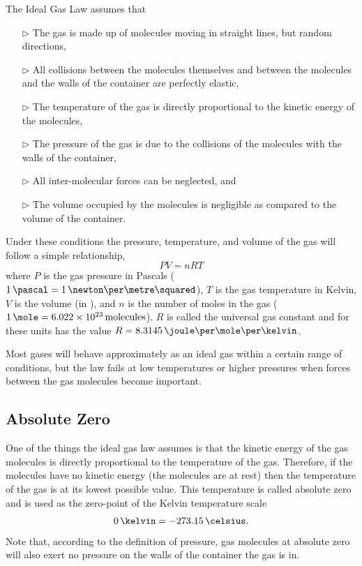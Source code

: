 The Ideal Gas Law assumes that
\begin{itemize}
\item[$\triangleright$] The gas is made up of molecules moving in straight lines, but random directions,
\item[$\triangleright$] All collisions between the molecules themselves and between the molecules and the walls of the container are perfectly elastic,
\item[$\triangleright$] The temperature of the gas is directly proportional to the kinetic energy of the molecules,
\item[$\triangleright$] The pressure of the gas is due to the collisions of the molecules with the walls of the container,
\item[$\triangleright$] All inter-molecular forces can be neglected, and
\item[$\triangleright$] The volume occupied by the molecules is negligible as compared to the volume of the container.
\end{itemize}
Under these conditions the pressure, temperature, and volume of the gas will follow a simple relationship,
\begin{equation}
  \label{eq:idealgas}
  P V = n R T
\end{equation}
where
$P$ is the gas pressure in Pascals ($1\,\pascal = 1\,\newton\per\metre\squared$), $T$ is the gas temperature in Kelvin, $V$ is the volume (in \metre\cubed), and $n$ is the number of moles in the gas ($1\,\mole = 6.022\times10^{23}\,\mbox{molecules}$).  $R$ is called the universal gas constant and for these units has the value $R = 8.3145\,\joule\per\mole\per\kelvin$.

Most gases will behave approximately as an ideal gas within a certain range of conditions, but the law fails at low temperatures or higher pressures when forces between the gas molecules become important.

\subsection{Absolute Zero}

One of the things the ideal gas law assumes is that the kinetic energy of the gas molecules is directly proportional to the temperature of the gas. Therefore, if the molecules have no kinetic energy (the molecules are at rest) then the temperature of the gas is at its lowest possible value. This temperature is called absolute zero and is used as the zero-point of the Kelvin temperature scale
\[
0\,\kelvin = -273.15\,\celsius.
\]
Note that, according to the definition of pressure, gas molecules at absolute zero will also exert no pressure on the walls of the container the gas is in.

